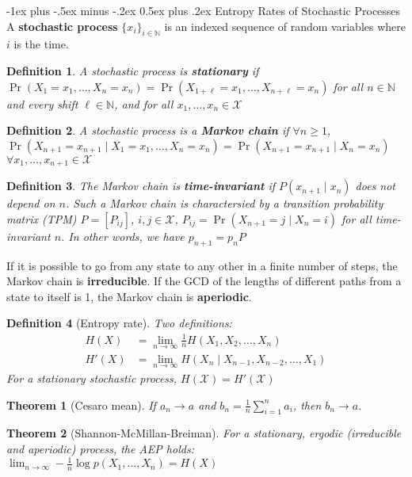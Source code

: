 \documentclass[frenchspacing,9pt,landscape,a4paper]{article}
\makeatletter
\renewcommand{\section}{\@startsection{section}{1}{0mm}%
                                {-1ex plus -.5ex minus -.2ex}%
                                {0.5ex plus .2ex}%
                                {\normalfont\large\bfseries}}
\newcommand{\BN}{\mathbb N}
\DeclareMathOperator{\pr}{Pr}
\newtheorem*{thm}{Theorem}
\newtheorem*{defn}{Definition}
\makeatother
\begin{document}
\begin{multicols}{4}
\section{Entropy Rates of Stochastic Processes}
A \textbf{stochastic process} $\{x_i\}_{i\in\BN}$ is an indexed sequence of random variables where  $i$ is
the time.
\begin{defn}
    A stochastic process is \textbf{stationary} if
    $\pr(X_1=x_1,\dots,X_n=x_n)=\pr(X_{1+\ell}=x_1,\dots,X_{n+\ell}=x_n)$ for all $n\in\BN$ and every shift
    $\ell\in\BN$, and for all $x_1,\dots,x_n\in\mathcal{X}$
\end{defn}
\begin{defn}
    A stochastic process is a \textbf{Markov chain} if $\forall n\geq 1$,  $\pr(X_{n+1}=x_{n+1}\mid
    X_1=x_1,\dots,X_n=x_n)=\pr(X_{n+1}=x_{n+1}\mid X_n=x_n)$ $\forall x_1,\dots,x_{n+1}\in\mathcal{X}$
\end{defn}
\begin{defn}
    The Markov chain is \textbf{time-invariant} if $P(x_{n+1}\mid x_n)$ does not depend on  $n$. Such a
    Markov chain is charactersied by a transition probability matrix (TPM)  $P=[P_{ij}]$,
    $i,j\in\mathcal{X}$,  $P_{ij}=\pr(X_{n+1}=j\mid X_n=i)$ for all time-invariant  $n$. In other words, we
    have  $p_{n+1}=p_nP$
\end{defn}
If it is possible to go from any state to any other in a finite number of steps, the Markov chain is
\textbf{irreducible}. If the GCD of the lengths of different paths from a state to itself is 1, the Markov
chain is \textbf{aperiodic}.
\begin{defn}[Entropy rate]
    Two definitions:
    \begin{align*}
        H(X)&=\lim_{n\to\infty}\frac{1}{n}H(X_1,X_2,\dots,X_n)\\
        H'(X)&=\lim_{n\to\infty}H(X_n\mid X_{n-1},X_{n-2},\dots,X_1)
    \end{align*} For a stationary stochastic process, $H(\mathcal{X})=H'(\mathcal{X})$
\end{defn}
\begin{thm}[Cesaro mean]
    If $a_n\to a$ and  $b_n=\frac{1}{n}\sum_{i=1}^n a_i$, then $b_n\to a$.
\end{thm}
\begin{thm}[Shannon-McMillan-Breiman]
    For a stationary, ergodic (irreducible and aperiodic) process, the AEP holds: $\lim_{n\to\infty}-\frac{1}{n}\log
    p(X_1,\dots,X_n)=H(X)$
\end{thm}
\begin{itemize}

\end{itemize}
\end{multicols}
\end{document}
